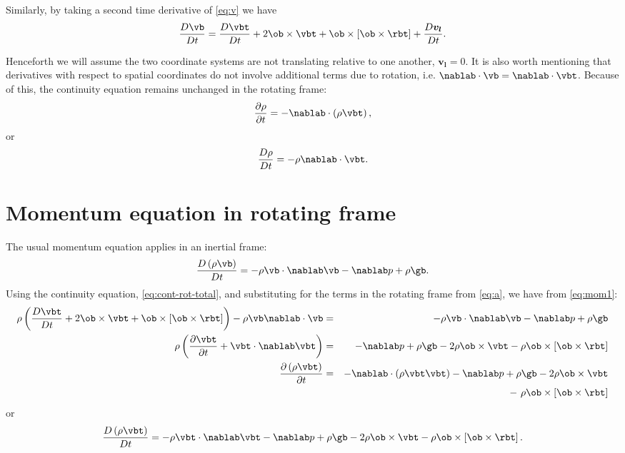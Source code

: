 Similarly, by taking a second time derivative of \ref{eq:v} we have
  \begin{equation}\label{eq:a}
    \frac{D\vb}{Dt} = \frac{D\vbt}{Dt} + 2\ob\times\vbt + \ob\times\left[\ob\times\rbt\right] + \frac{D\boldsymbol{v_l}}{Dt}.
  \end{equation}

Henceforth we will assume the two coordinate systems are not
translating relative to one another, \(\boldsymbol{v_l} = 0\).  It is
also worth mentioning that derivatives with respect to spatial
coordinates do not involve additional terms due to rotation,
i.e. \(\nablab\cdot\vb = \nablab\cdot\vbt\).
Because of this, the continuity equation remains unchanged in the
rotating frame:
  \begin{equation}\label{eq:cont-rot}
    \frac{\partial \rho}{\partial t} = -\nablab\cdot\left(\rho\vbt\right),
  \end{equation}
or 
  \begin{equation}\label{eq:cont-rot-total}
    \frac{D\rho}{Dt} = -\rho\nablab\cdot\vbt.
  \end{equation}

\section{Momentum equation in rotating frame}
The usual momentum equation applies in an inertial frame:
  \begin{equation}\label{eq:mom1}
    \frac{D\left(\rho\vb\right)}{Dt} = -\rho\vb\cdot\nablab\vb - \nablab p + \rho\gb.
  \end{equation}
Using the continuity equation, \ref{eq:cont-rot-total}, and substituting for
the terms in the rotating frame from \ref{eq:a}, we have from \ref{eq:mom1}:
  \begin{eqnarray}
    \rho\left(\frac{D\vbt}{Dt} + 2\ob\times\vbt + \ob\times\left[\ob\times\rbt\right]\right) - \rho\vb\nablab\cdot\vb &=& -\rho\vb\cdot\nablab\vb - \nablab p + \rho\gb \nonumber \\
    \rho\left(\frac{\partial\vbt}{\partial t} + \vbt\cdot\nablab\vbt\right) &=& -\nablab p + \rho\gb - 2\rho\ob\times\vbt - \rho\ob\times\left[\ob\times\rbt\right] \nonumber \\
  \frac{\partial\left(\rho\vbt\right)}{\partial t} &=& -\nablab\cdot\left(\rho\vbt\vbt\right) - \nablab p + \rho\gb - 2\rho\ob\times\vbt \nonumber \\
  & & -\ \rho\ob\times\left[\ob\times\rbt\right]\label{eq:mom-rot}
  \end{eqnarray}
or
  \begin{equation}\label{eq:mom-rot-tot}
    \frac{D\left(\rho\vbt\right)}{Dt} = -\rho\vbt\cdot\nablab\vbt - \nablab p + \rho\gb - 2\rho\ob\times\vbt - \rho\ob\times\left[\ob\times\rbt\right].
  \end{equation}

